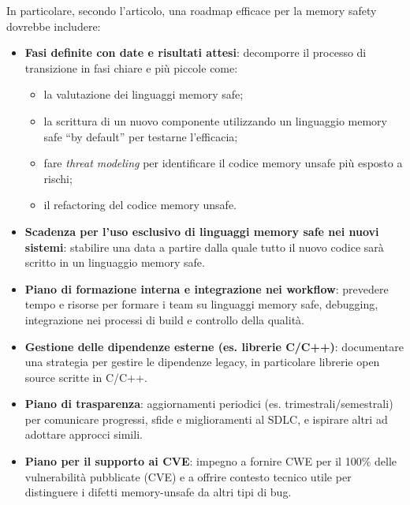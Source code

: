 In particolare, secondo l'articolo, una roadmap efficace per la memory safety
dovrebbe includere:

\begin{itemize}
  \item \textbf{Fasi definite con date e risultati attesi}: decomporre il processo
    di transizione in fasi chiare e più piccole come:
    \begin{itemize}
      \item la valutazione dei linguaggi memory safe;

      \item la scrittura di un nuovo componente utilizzando un linguaggio memory
        safe ``by default'' per testarne l'efficacia;

      \item fare \textit{threat modeling} per identificare il codice memory
        unsafe più esposto a rischi;

      \item il refactoring del codice memory unsafe.
    \end{itemize}

  \item \textbf{Scadenza per l'uso esclusivo di linguaggi memory safe nei nuovi
    sistemi}: stabilire una data a partire dalla quale tutto il nuovo codice sarà
    scritto in un linguaggio memory safe.

  \item \textbf{Piano di formazione interna e integrazione nei workflow}: prevedere
    tempo e risorse per formare i team su linguaggi memory safe, debugging, integrazione
    nei processi di build e controllo della qualità.

  \item \textbf{Gestione delle dipendenze esterne (es. librerie C/C++)}: documentare
    una strategia per gestire le dipendenze legacy, in particolare librerie open
    source scritte in C/C++.

  \item \textbf{Piano di trasparenza}: aggiornamenti periodici (es. trimestrali/semestrali)
    per comunicare progressi, sfide e miglioramenti al SDLC, e ispirare altri ad
    adottare approcci simili.

  \item \textbf{Piano per il supporto ai CVE}: impegno a fornire CWE per il 100\%
    delle vulnerabilità pubblicate (CVE) e a offrire contesto tecnico utile per
    distinguere i difetti memory-unsafe da altri tipi di bug.
\end{itemize}

